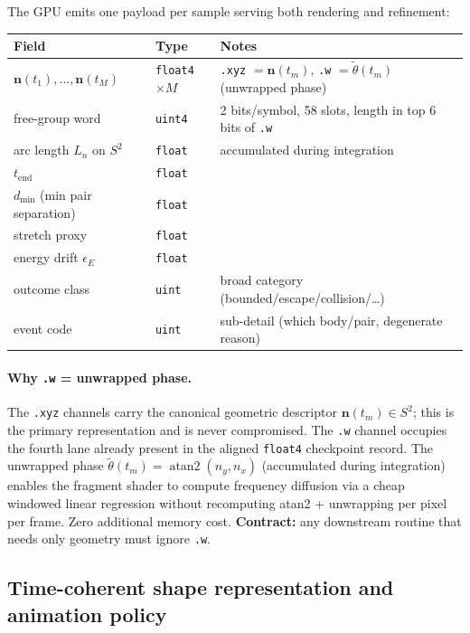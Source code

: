 \documentclass[11pt]{report}
\DeclareMathOperator{\atanTwo}{atan2}
\begin{document}
The GPU emits one payload per sample serving both rendering and refinement:
\begin{center}
\begin{tabular}{lll}
\toprule
Field & Type & Notes \\
\midrule
$\mathbf n(t_1),\ldots,\mathbf n(t_M)$ & \texttt{float4}$\times M$ & \texttt{.xyz} $= \mathbf n(t_m)$, \texttt{.w} $= \tilde\theta(t_m)$ (unwrapped phase) \\
free-group word & \texttt{uint4} & 2 bits/symbol, 58 slots, length in top 6 bits of \texttt{.w} \\
arc length $L_n$ on $S^2$ & \texttt{float} & accumulated during integration \\
$t_{\mathrm{end}}$ & \texttt{float} & \\
$d_{\min}$ (min pair separation) & \texttt{float} & \\
stretch proxy & \texttt{float} & \\
energy drift $\epsilon_E$ & \texttt{float} & \\
outcome class & \texttt{uint} & broad category (bounded/escape/collision/\ldots) \\
event code & \texttt{uint} & sub-detail (which body/pair, degenerate reason) \\
\bottomrule
\end{tabular}
\end{center}

\paragraph{Why \texttt{.w} = unwrapped phase.} The \texttt{.xyz} channels carry the canonical geometric descriptor $\mathbf n(t_m)\in S^2$; this is the primary representation and is never compromised. The \texttt{.w} channel occupies the fourth lane already present in the aligned \texttt{float4} checkpoint record. The unwrapped phase $\tilde\theta(t_m)=\atanTwo(n_y,n_x)$ (accumulated during integration) enables the fragment shader to compute frequency diffusion via a cheap windowed linear regression without recomputing atan2 + unwrapping per pixel per frame. Zero additional memory cost. \textbf{Contract:} any downstream routine that needs only geometry must ignore \texttt{.w}.

\subsection{Time-coherent shape representation and animation policy}
\label{sec:animation_policy}
\end{document}
